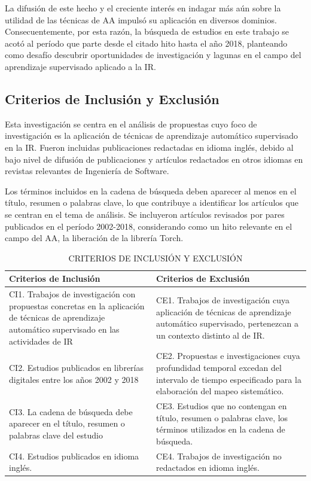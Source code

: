 \documentclass[journal]{IEEEtran}
\begin{document}
La difusión de este hecho y el creciente interés en indagar más aún sobre la utilidad de las técnicas de AA impulsó su aplicación en diversos dominios. Consecuentemente, por esta razón, la búsqueda de estudios en este trabajo se acotó al período que parte desde el citado hito hasta el año 2018, planteando como desafío descubrir oportunidades de investigación y lagunas en el campo del aprendizaje supervisado aplicado a la IR.
\subsection{Criterios de Inclusión y Exclusión}

Esta investigación se centra en el análisis de propuestas cuyo foco de investigación es la aplicación de técnicas de aprendizaje automático supervisado en la IR. Fueron incluidas publicaciones redactadas en idioma inglés, debido al bajo nivel de difusión de publicaciones y artículos redactados en otros idiomas en revistas relevantes de Ingeniería de Software. 

Los términos incluidos en la cadena de búsqueda deben aparecer al menos en el título, resumen o palabras clave, lo que contribuye a identificar los artículos que se centran en el tema de análisis. Se incluyeron artículos revisados por pares publicados en el período 2002-2018, considerando como un hito relevante en el campo del AA, la liberación de la librería Torch.

\begin{table}[!t]
\renewcommand{\arraystretch}{1.3}
\caption{CRITERIOS DE INCLUSIÓN Y EXCLUSIÓN}
\label{tabla2}
\centering
\begin{tabular}{p{3.5cm}p{4cm}}
\hline
\hline
Criterios de Inclusión & Criterios de Exclusión \\
\hline
CI1. Trabajos de investigación con propuestas concretas en la aplicación de técnicas de aprendizaje automático supervisado en las actividades de IR  & CE1. Trabajos de investigación cuya aplicación de técnicas de aprendizaje automático supervisado,
pertenezcan a un contexto distinto al de IR.\\ \cline{1-2}
CI2. Estudios publicados en librerías digitales entre los años 2002 y 2018 & CE2. Propuestas e investigaciones
cuya profundidad temporal excedan del intervalo de tiempo especificado para la elaboración del mapeo sistemático. \\ \cline{1-2}
CI3. La cadena de búsqueda debe aparecer en el título, resumen o palabras clave del estudio & CE3. Estudios que no contengan en título, resumen o palabras clave, los términos utilizados en la cadena de búsqueda. \\ \cline{1-2}
CI4. Estudios publicados en idioma inglés. & CE4. Trabajos de investigación no redactados en idioma inglés. \\
\hline \hline                                                                                                    
\end{tabular}
\end{table}
\end{document}
